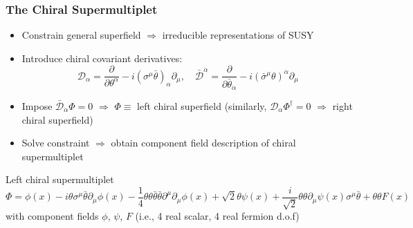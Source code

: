 \documentclass[10pt,aspectratio=169]{beamer}
\begin{document}
\begin{frame}
  \frametitle{The Chiral Supermultiplet}
  \begin{itemize}\itemsep1em
  \item Constrain general superfield $\Rightarrow$ {\color{blue} irreducible
    representations of SUSY}
  \item Introduce chiral covariant derivatives:
    \begin{equation*}
      \mathcal{D}_\alpha = \frac{\partial}{\partial \theta^\alpha}
      - i \left (\sigma^\mu \bar{\theta} \right )_\alpha \partial_\mu , \quad
      \bar{\mathcal{D}}^{\dot{\alpha}} = \frac{\partial}
          {\partial \bar{\theta}_{\dot{\alpha}}}  - i \left ( \bar{\sigma}^\mu
            \theta \right )^{\dot{\alpha}} \partial_\mu
    \end{equation*}
  \item Impose $\bar{\mathcal{D}}_{\dot{\alpha}} \Phi = 0$ $\Rightarrow$ $\Phi
    \equiv$ {\color{blue} left chiral superfield} (similarly,
    $\mathcal{D}_\alpha \Phi^\dagger = 0$ $\Rightarrow$ right chiral
    superfield)
  \item Solve constraint $\Rightarrow$ obtain component field description
    of chiral supermultiplet
  \end{itemize}
  \begin{block}{Left chiral supermultiplet}
    \begin{equation*}
      \Phi = \phi(x) - i \theta\sigma^\mu\bar{\theta} \partial_\mu
      \phi(x) - \frac{1}{4} \theta\theta\bar{\theta}\bar{\theta} \partial^\mu
      \partial_\mu \phi(x) + \sqrt{2} \theta \psi(x)
      + \frac{i}{\sqrt{2}} \theta\theta
      \partial_\mu \psi(x)\sigma^\mu \bar{\theta} + \theta \theta F(x)
    \end{equation*}
    with component fields $\phi$, $\psi$, $F$ (i.e., 4 real scalar, 4
    real fermion d.o.f)
  \end{block}
\end{frame}
\end{document}

